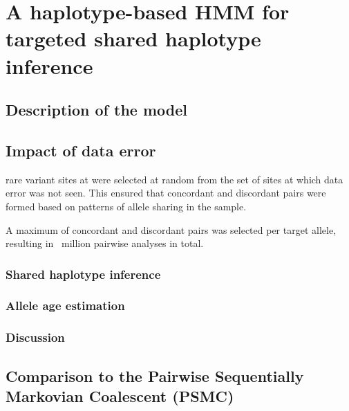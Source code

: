 %
%
%
%


%
\section{A haplotype-based HMM for targeted shared haplotype inference}
%


%
\subsection{Description of the model}
%


%

%




%
\subsection{Impact of data error}
%


 rare variant sites at \fk{[2,50]} were selected at random from the set of sites at which data error was not seen.
This ensured that concordant and discordant pairs were formed based on patterns of allele sharing in the sample.

A maximum of  concordant and  discordant pairs was selected per target allele, resulting in ~million pairwise analyses in total.


%
\subsubsection{Shared haplotype inference}
%


%

%


%
\subsubsection{Allele age estimation}
%


%

%


%

%



%
\subsubsection{Discussion}
%




%
\subsection{Comparison to the Pairwise Sequentially Markovian Coalescent (PSMC)}
%


